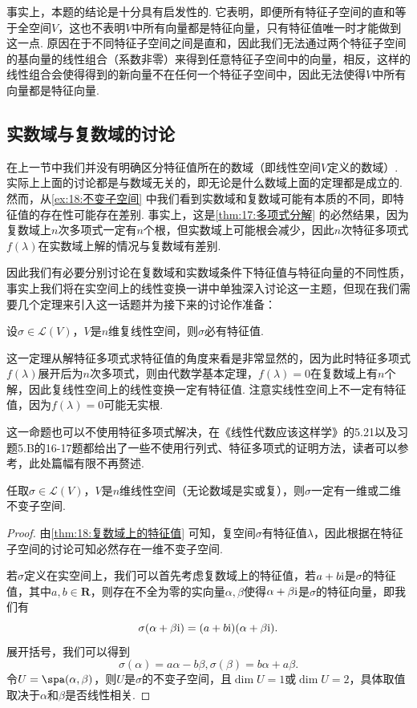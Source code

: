 事实上，本题的结论是十分具有启发性的. 它表明，即便所有特征子空间的直和等于全空间$V$，这也不表明$V$中所有向量都是特征向量，只有特征值唯一时才能做到这一点. 原因在于不同特征子空间之间是直和，因此我们无法通过两个特征子空间的基向量的线性组合（系数非零）来得到任意特征子空间中的向量，相反，这样的线性组合会使得得到的新向量不在任何一个特征子空间中，因此无法使得$V$中所有向量都是特征向量.

\subsection{实数域与复数域的讨论}

在上一节中我们并没有明确区分特征值所在的数域（即线性空间$V$定义的数域）. 实际上上面的讨论都是与数域无关的，即无论是什么数域上面的定理都是成立的. 然而，从\autoref{ex:18:不变子空间} 中我们看到实数域和复数域可能有本质的不同，即特征值的存在性可能存在差别. 事实上，这是\autoref{thm:17:多项式分解} 的必然结果，因为复数域上$n$次多项式一定有$n$个根，但实数域上可能根会减少，因此$n$次特征多项式$f(\lambda)$在实数域上解的情况与复数域有差别.

因此我们有必要分别讨论在复数域和实数域条件下特征值与特征向量的不同性质，事实上我们将在实空间上的线性变换一讲中单独深入讨论这一主题，但现在我们需要几个定理来引入这一话题并为接下来的讨论作准备：
\begin{theorem}\label{thm:18:复数域上的特征值}
    设$\sigma\in \mathcal{L}(V)$，$V$是$n$维复线性空间，则$\sigma$必有特征值.
\end{theorem}

这一定理从解特征多项式求特征值的角度来看是非常显然的，因为此时特征多项式$f(\lambda)$展开后为$n$次多项式，则由代数学基本定理，$f(\lambda)=0$在复数域上有$n$个解，因此复线性空间上的线性变换一定有特征值. 注意实线性空间上不一定有特征值，因为$f(\lambda)=0$可能无实根.

这一命题也可以不使用特征多项式解决，在《线性代数应该这样学》的5.21以及习题5.B的16-17题都给出了一些不使用行列式、特征多项式的证明方法，读者可以参考，此处篇幅有限不再赘述.

\begin{theorem}\label{thm:18:特征值与不变子空间}
    任取$\sigma\in \mathcal{L}(V)$，$V$是$n$维线性空间（无论数域是实或复），则$\sigma$一定有一维或二维不变子空间.
\end{theorem}

\begin{proof}
    由\autoref{thm:18:复数域上的特征值} 可知，复空间$\sigma$有特征值$\lambda$，因此根据在特征子空间的讨论可知必然存在一维不变子空间.

    若$\sigma$定义在实空间上，我们可以首先考虑复数域上的特征值，若$a+b\textup{i}$是$\sigma$的特征值，其中$a,b\in\mathbf{R}$，则存在不全为零的实向量$\alpha,\beta$使得$\alpha+\beta\textup{i}$是$\sigma$的特征向量，即我们有
    \[\sigma(\alpha+\beta\textup{i})=(a+b\textup{i})(\alpha+\beta\textup{i}).\]
    展开括号，我们可以得到
    \[\sigma(\alpha)=a\alpha-b\beta,\sigma(\beta)=b\alpha+a\beta.\]
    令$U=\spa(\alpha,\beta)$，则$U$是$\sigma$的不变子空间，且$\dim U=1$或$\dim U=2$，具体取值取决于$\alpha$和$\beta$是否线性相关.
\end{proof}

